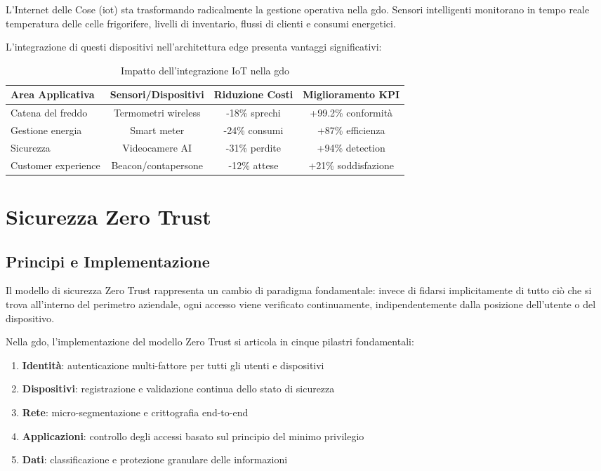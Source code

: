 L'Internet delle Cose (\gls{iot}) sta trasformando radicalmente la gestione operativa nella \gls{gdo}. Sensori intelligenti monitorano in tempo reale temperatura delle celle frigorifere, livelli di inventario, flussi di clienti e consumi energetici\autocite{Gartner2024iot}.

L'integrazione di questi dispositivi nell'architettura edge presenta vantaggi significativi:

\begin{table}[htbp]
\centering
\caption{Impatto dell'integrazione IoT nella \gls{gdo}}
\label{tab:iot_impact}
\small
\begin{tabularx}{\textwidth}{|X|c|c|c|}
\hline
\textbf{Area Applicativa} & \textbf{Sensori/Dispositivi} & \textbf{Riduzione Costi} & \textbf{Miglioramento KPI} \\
\hline
Catena del freddo & Termometri wireless & -18\% sprechi & +99.2\% conformità \\
\hline
Gestione energia & Smart meter & -24\% consumi & +87\% efficienza \\
\hline
Sicurezza & Videocamere AI & -31\% perdite & +94\% detection \\
\hline
Customer experience & Beacon/contapersone & -12\% attese & +21\% soddisfazione \\
\hline
\end{tabularx}
\end{table}

\section{Sicurezza Zero Trust}
\label{sec:zero_trust}

\subsection{Principi e Implementazione}
\label{subsec:zero_trust_principles}

Il modello di sicurezza Zero Trust rappresenta un cambio di paradigma fondamentale: invece di fidarsi implicitamente di tutto ciò che si trova all'interno del perimetro aziendale, ogni accesso viene verificato continuamente, indipendentemente dalla posizione dell'utente o del dispositivo\autocite{NIST2024zero}.

Nella \gls{gdo}, l'implementazione del modello Zero Trust si articola in cinque pilastri fondamentali:

\begin{enumerate}
    \item \textbf{Identità}: autenticazione multi-fattore per tutti gli utenti e dispositivi
    \item \textbf{Dispositivi}: registrazione e validazione continua dello stato di sicurezza
    \item \textbf{Rete}: micro-segmentazione e crittografia end-to-end
    \item \textbf{Applicazioni}: controllo degli accessi basato sul principio del minimo privilegio
    \item \textbf{Dati}: classificazione e protezione granulare delle informazioni
\end{enumerate}

